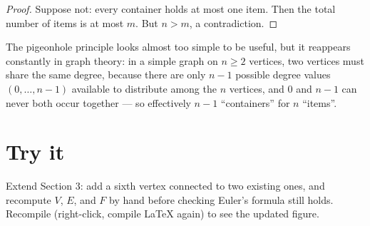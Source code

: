 \documentclass[11pt]{article}
\theoremstyle{definition}
\begin{document}
\begin{proof}
Suppose not: every container holds at most one item. Then the total number
of items is at most $m$. But $n > m$, a contradiction.
\end{proof}

The pigeonhole principle looks almost too simple to be useful, but it
reappears constantly in graph theory: in a simple graph on $n \geq 2$
vertices, two vertices must share the same degree, because there are only
$n - 1$ possible degree values $(0, \dots, n-1)$ available to distribute
among the $n$ vertices, and $0$ and $n-1$ can never both occur together —
so effectively $n - 1$ ``containers'' for $n$ ``items''.

\section{Try it}

Extend Section 3: add a sixth vertex connected to two existing ones, and
recompute $V$, $E$, and $F$ by hand before checking Euler's formula still
holds. Recompile (right-click, compile LaTeX again) to see the updated
figure.
\end{document}
